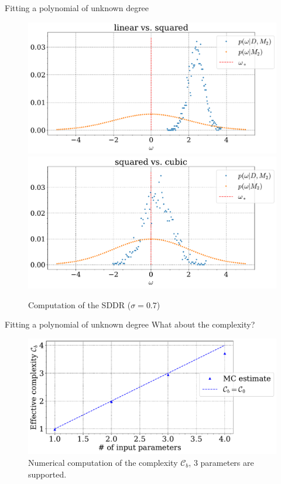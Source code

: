 \documentclass[11pt,aspectratio=1610,dvipsnames]{beamer}
\begin{document}
\begin{frame}{Fitting a polynomial of unknown degree}
\begin{minipage}{.49\linewidth}
	\end{minipage}
	\hfill
	\begin{minipage}{.49\linewidth}
		\begin{figure}[H]
			\centering
			\includegraphics[width=\linewidth]{SDDR_linear vs. squared_sigma_07a+_trans.png}
			\includegraphics[width=\linewidth]{SDDR_squared vs. cubic_sigma_07a+.pdf}
			\caption{Computation of the SDDR  ($\sigma=0.7$)}
			\label{fig:sddr}
		\end{figure}
	\end{minipage}

\end{frame}
\begin{frame}{Fitting a polynomial of unknown degree}
	What about the complexity?
	\begin{figure}
		\centering
		\includegraphics[width=\linewidth]{_sigma_07acomplexity.pdf}
		\caption{Numerical computation of the complexity $\mathcal{C}_b$, 3 parameters are supported.}
	\end{figure}
\end{frame}
\end{document}
